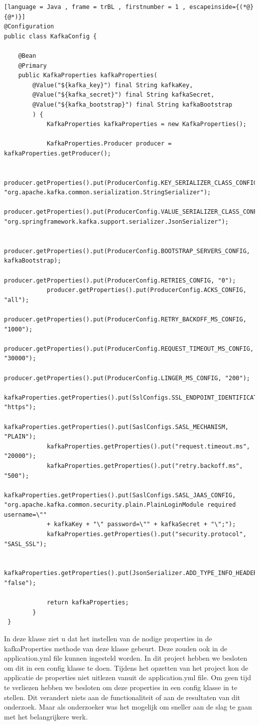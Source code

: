 \begin{lstlisting}[language = Java , frame = trBL , firstnumber = 1 , escapeinside={(*@}{@*)}]
@Configuration
public class KafkaConfig {

    @Bean
    @Primary
    public KafkaProperties kafkaProperties(
        @Value("${kafka_key}") final String kafkaKey,
        @Value("${kafka_secret}") final String kafkaSecret,
        @Value("${kafka_bootstrap}") final String kafkaBootstrap
        ) {
            KafkaProperties kafkaProperties = new KafkaProperties();

            KafkaProperties.Producer producer = kafkaProperties.getProducer();

            producer.getProperties().put(ProducerConfig.KEY_SERIALIZER_CLASS_CONFIG, "org.apache.kafka.common.serialization.StringSerializer");
            producer.getProperties().put(ProducerConfig.VALUE_SERIALIZER_CLASS_CONFIG, "org.springframework.kafka.support.serializer.JsonSerializer");

            producer.getProperties().put(ProducerConfig.BOOTSTRAP_SERVERS_CONFIG, kafkaBootstrap);
            producer.getProperties().put(ProducerConfig.RETRIES_CONFIG, "0");
            producer.getProperties().put(ProducerConfig.ACKS_CONFIG, "all");
            producer.getProperties().put(ProducerConfig.RETRY_BACKOFF_MS_CONFIG, "1000");
            producer.getProperties().put(ProducerConfig.REQUEST_TIMEOUT_MS_CONFIG, "30000");
            producer.getProperties().put(ProducerConfig.LINGER_MS_CONFIG, "200");
            kafkaProperties.getProperties().put(SslConfigs.SSL_ENDPOINT_IDENTIFICATION_ALGORITHM_CONFIG, "https");
            kafkaProperties.getProperties().put(SaslConfigs.SASL_MECHANISM, "PLAIN");
            kafkaProperties.getProperties().put("request.timeout.ms", "20000");
            kafkaProperties.getProperties().put("retry.backoff.ms", "500");
            kafkaProperties.getProperties().put(SaslConfigs.SASL_JAAS_CONFIG, "org.apache.kafka.common.security.plain.PlainLoginModule required username=\""
            + kafkaKey + "\" password=\"" + kafkaSecret + "\";");
            kafkaProperties.getProperties().put("security.protocol", "SASL_SSL");

            kafkaProperties.getProperties().put(JsonSerializer.ADD_TYPE_INFO_HEADERS, "false");

            return kafkaProperties;
        }
 }
\end{lstlisting}

In deze klasse ziet u dat het instellen van de nodige properties in de kafkaProperties methode van deze klasse gebeurt. Deze zouden ook in de application.yml file kunnen ingesteld worden. In dit project hebben we besloten om dit in een config klasse te doen. Tijdens het opzetten van het project kon de applicatie de properties niet uitlezen vanuit de application.yml file. Om geen tijd te verliezen hebben we besloten om deze properties in een config klasse in te stellen. Dit verandert niets aan de functionaliteit of aan de resultaten van dit onderzoek. Maar als onderzoeker was het mogelijk om sneller aan de slag te gaan met het belangrijkere werk.

